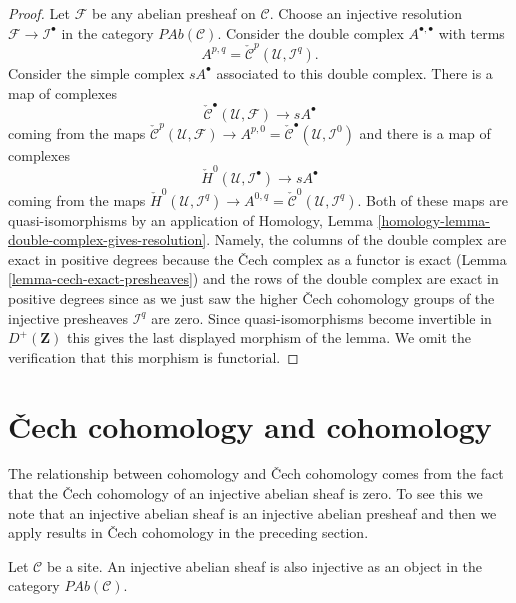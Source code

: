 \begin{proof}
\medskip\noindent
Let $\mathcal{F}$ be any abelian presheaf on $\mathcal{C}$.
Choose an injective resolution $\mathcal{F} \to \mathcal{I}^\bullet$
in the category $\textit{PAb}(\mathcal{C})$.
Consider the double complex $A^{\bullet, \bullet}$ with terms
$$
A^{p, q} =
\check{\mathcal{C}}^p(\mathcal{U}, \mathcal{I}^q).
$$
Consider the simple complex $sA^\bullet$ associated to this double
complex. There is a map of complexes
$$
\check{\mathcal{C}}^\bullet(\mathcal{U}, \mathcal{F})
\longrightarrow
sA^\bullet
$$
coming from the maps
$\check{\mathcal{C}}^p(\mathcal{U}, \mathcal{F})
\to A^{p, 0} = \check{\mathcal{C}}^\bullet(\mathcal{U}, \mathcal{I}^0)$
and there is a map of complexes
$$
\check{H}^0(\mathcal{U}, \mathcal{I}^\bullet)
\longrightarrow
sA^\bullet
$$
coming from the maps
$\check{H}^0(\mathcal{U}, \mathcal{I}^q) \to
A^{0, q} = \check{\mathcal{C}}^0(\mathcal{U}, \mathcal{I}^q)$.
Both of these maps are quasi-isomorphisms by an application of
Homology, Lemma \ref{homology-lemma-double-complex-gives-resolution}.
Namely, the columns of the double complex are exact in positive degrees
because the {\v C}ech complex as a functor is exact
(Lemma \ref{lemma-cech-exact-presheaves})
and the rows of the double complex are exact in positive degrees
since as we just saw the higher {\v C}ech cohomology groups of the injective
presheaves $\mathcal{I}^q$ are zero.
Since quasi-isomorphisms become invertible
in $D^{+}(\mathbf{Z})$ this gives the last displayed morphism
of the lemma. We omit the verification that this morphism is
functorial.
\end{proof}





\section{{\v C}ech cohomology and cohomology}
\label{section-cech-cohomology-cohomology}

\noindent
The relationship between cohomology and {\v C}ech cohomology comes from the fact
that the {\v C}ech cohomology of an injective abelian sheaf is zero. To see this
we note that an injective abelian sheaf is an injective abelian presheaf and
then we apply results in {\v C}ech cohomology in the preceding section.

\begin{lemma}
\label{lemma-injective-abelian-sheaf-injective-presheaf}
Let $\mathcal{C}$ be a site. An injective abelian sheaf is also injective as an
object in the category $\textit{PAb}(\mathcal{C})$.
\end{lemma}

